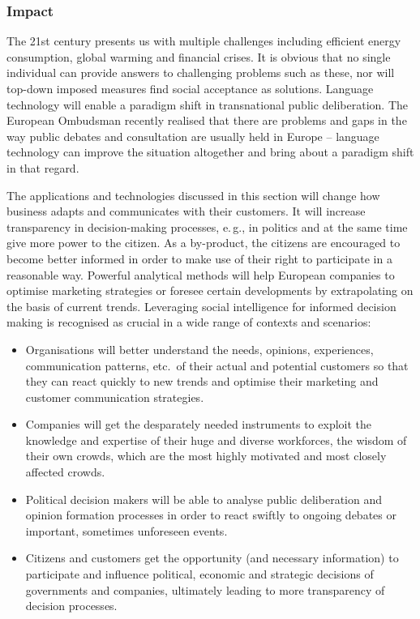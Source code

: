 \documentclass[10pt, plain]{../../metanetpaper}
\begin{document}
\begin{multicols}{2}
\subsubsection{Impact}
\label{sec:impact-pt2}

The 21st century presents us with multiple challenges including efficient energy consumption, global warming and financial crises. It is obvious that no single individual can provide answers to challenging problems such as these, nor will top-down imposed measures find social acceptance as solutions. Language technology will enable a paradigm shift in transnational public deliberation. The European Ombudsman recently realised \cite{ombudsman2012} that there are problems and gaps in the way public debates and consultation are usually held in Europe -- language technology can improve the situation altogether and bring about a paradigm shift in that regard.
 
The applications and technologies discussed in this section will change how business adapts and communicates with their customers. It will increase transparency in decision-making processes, e.\,g., in politics and at the same time give more power to the citizen. As a by-product, the citizens are encouraged to become better informed in order to make use of their right to participate in a reasonable way. Powerful analytical methods will help European companies to optimise marketing strategies or foresee certain developments by extrapolating on the basis of current trends. Leveraging social intelligence for informed decision making is recognised as crucial in a wide range of contexts and scenarios:

\begin{itemize}
\item Organisations will better understand the needs, opinions, experiences, communication patterns, etc.~of their actual and potential customers so that they can react quickly to new trends and optimise their marketing and customer communication strategies.
\item Companies will get the desparately needed instruments to exploit the knowledge and expertise of their huge and diverse workforces, the wisdom of their own crowds, which are the most highly motivated and most closely affected crowds.
\item Political decision makers will be able to analyse public deliberation and opinion formation processes in order to react swiftly to ongoing debates or important, sometimes unforeseen events.
\item Citizens and customers get the opportunity (and necessary information) to participate and influence political, economic and strategic decisions of governments and companies, ultimately leading to more transparency of decision processes.
\end{itemize}


\end{multicols}
\end{document}
